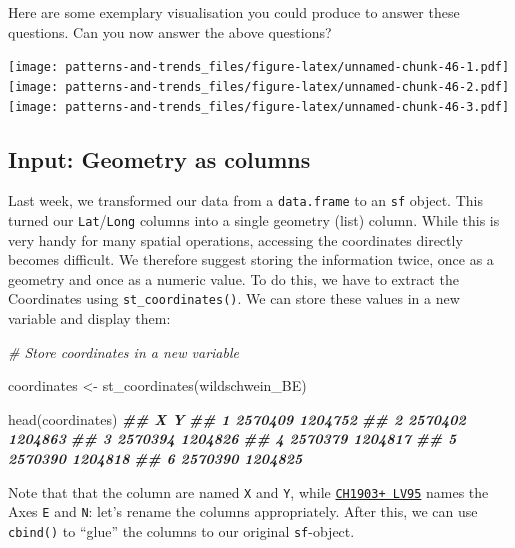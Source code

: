 \documentclass[
]{book}
\newenvironment{Shaded}{\begin{snugshade}}{\end{snugshade}}
\newcommand{\CommentTok}[1]{\textcolor[rgb]{0.56,0.35,0.01}{\textit{#1}}}
\newcommand{\DocumentationTok}[1]{\textcolor[rgb]{0.56,0.35,0.01}{\textbf{\textit{#1}}}}
\newcommand{\FunctionTok}[1]{\textcolor[rgb]{0.00,0.00,0.00}{#1}}
\newcommand{\NormalTok}[1]{#1}
\newcommand{\OtherTok}[1]{\textcolor[rgb]{0.56,0.35,0.01}{#1}}
\begin{document}
Here are some exemplary visualisation you could produce to answer these questions. Can you now answer the above questions?

\texttt{[image: patterns-and-trends\_files/figure-latex/unnamed-chunk-46-1.pdf]} \texttt{[image: patterns-and-trends\_files/figure-latex/unnamed-chunk-46-2.pdf]} \texttt{[image: patterns-and-trends\_files/figure-latex/unnamed-chunk-46-3.pdf]}

\hypertarget{input-geometry-as-columns}{%
\subsection{Input: Geometry as columns}\label{input-geometry-as-columns}}

Last week, we transformed our data from a \texttt{data.frame} to an \texttt{sf} object. This turned our \texttt{Lat}/\texttt{Long} columns into a single geometry (list) column. While this is very handy for many spatial operations, accessing the coordinates directly becomes difficult. We therefore suggest storing the information twice, once as a geometry and once as a numeric value. To do this, we have to extract the Coordinates using \texttt{st\_coordinates()}. We can store these values in a new variable and display them:

\begin{Shaded}
\begin{Highlighting}[]
\CommentTok{\# Store coordinates in a new variable}

\NormalTok{coordinates }\OtherTok{\textless{}{-}} \FunctionTok{st\_coordinates}\NormalTok{(wildschwein\_BE)}

\FunctionTok{head}\NormalTok{(coordinates)}
\DocumentationTok{\#\#         X       Y}
\DocumentationTok{\#\# 1 2570409 1204752}
\DocumentationTok{\#\# 2 2570402 1204863}
\DocumentationTok{\#\# 3 2570394 1204826}
\DocumentationTok{\#\# 4 2570379 1204817}
\DocumentationTok{\#\# 5 2570390 1204818}
\DocumentationTok{\#\# 6 2570390 1204825}
\end{Highlighting}
\end{Shaded}

Note that that the column are named \texttt{X} and \texttt{Y}, while \href{https://www.swisstopo.admin.ch/de/wissen-fakten/geodaesie-vermessung/neue-koordinaten.html}{\texttt{CH1903+\ LV95}} names the Axes \texttt{E} and \texttt{N}: let's rename the columns appropriately. After this, we can use \texttt{cbind()} to ``glue'' the columns to our original \texttt{sf}-object.
\end{document}
